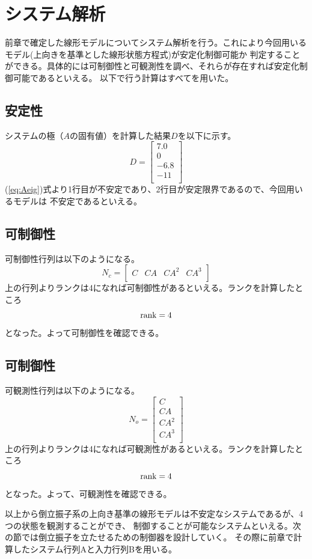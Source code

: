 \section{システム解析}
	前章で確定した線形モデルについてシステム解析を行う。これにより今回用いるモデル(上向きを基準とした線形状態方程式)が安定化制御可能か
	判定することができる。具体的には可制御性と可観測性を調べ、それらが存在すれば安定化制御可能であるといえる。
	以下で行う計算はすべて\MaTX{}を用いた。
	\subsection{安定性}
		システムの極（$A$の固有値）を計算した結果$D$を以下に示す。
		\begin{equation}
			D=\left[
			\begin{array}{c}
				7.0\\
				0\\
				-6.8\\
				-11\\
			\end{array}
			\right]
			\label{eq:Aeig}
		\end{equation}
		(\ref{eq:Aeig})式より1行目が不安定であり、2行目が安定限界であるので、今回用いるモデルは
		不安定であるといえる。
	\subsection{可制御性}
		可制御性行列は以下のようになる。
		\[
			N_{c} = \left[
			\begin{array}{cccc}
				C & CA & CA^{2} & CA^{3} \\
			\end{array}
			\right]
		\]
		上の行列よりランクは4になれば可制御性があるといえる。ランクを計算したところ
		\[
			\rm{rank}  = 4
		\]
		となった。よって可制御性を確認できる。\\
	\subsection{可制御性}
		可観測性行列は以下のようになる。
		\[
			N_{o} = \left[
			\begin{array}{c}
				C\\
				CA\\
				CA^{2}\\
				CA^{3}\\
			\end{array}
			\right]
		\]
		上の行列よりランクは4になれば可観測性があるといえる。ランクを計算したところ
		\[
			\rm{rank} = 4
		\]
		となった。よって、可観測性を確認できる。\\
	\par
	以上から倒立振子系の上向き基準の線形モデルは不安定なシステムであるが、4つの状態を観測することができ、
	制御することが可能なシステムといえる。次の節では倒立振子を立たせるための制御器を設計していく。
	その際に前章で計算したシステム行列Aと入力行列Bを用いる。
		

